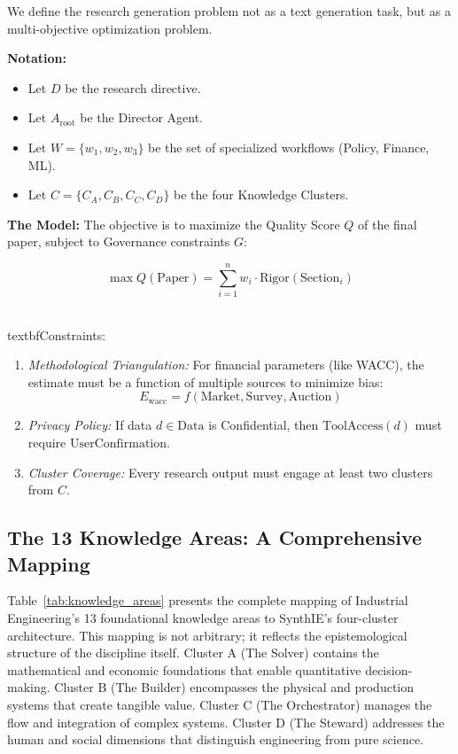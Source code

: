 \documentclass[12pt,a4paper]{article}
\begin{document}
We define the research generation problem not as a text generation task, but as a multi-objective optimization problem.

\textbf{Notation:}
\begin{itemize}[leftmargin=*]
    \item Let $D$ be the research directive.
    \item Let $A_{\text{root}}$ be the Director Agent.
    \item Let $W = \{w_1, w_2, w_3\}$ be the set of specialized workflows (Policy, Finance, ML).
    \item Let $C = \{C_A, C_B, C_C, C_D\}$ be the four Knowledge Clusters.
\end{itemize}

\textbf{The Model:} The objective is to maximize the Quality Score $Q$ of the final paper, subject to Governance constraints $G$:

\begin{equation}
\max Q(\text{Paper}) = \sum_{i=1}^{n} w_i \cdot \text{Rigor}(\text{Section}_i)
\end{equation}

\\textbf{Constraints:}
\begin{enumerate}[leftmargin=*]
    \item \textit{Methodological Triangulation:} For financial parameters (like WACC), the estimate must be a function of multiple sources to minimize bias:
    \begin{equation}
    E_{\text{wacc}} = f(\text{Market}, \text{Survey}, \text{Auction})
    \end{equation}
    
    \item \textit{Privacy Policy:} If data $d \in \text{Data}$ is Confidential, then $\text{ToolAccess}(d)$ must require $\text{UserConfirmation}$.
    
    \item \textit{Cluster Coverage:} Every research output must engage at least two clusters from $C$.
\end{enumerate}

\subsection{The 13 Knowledge Areas: A Comprehensive Mapping}

Table~\ref{tab:knowledge_areas} presents the complete mapping of Industrial Engineering's 13 foundational knowledge areas to SynthIE's four-cluster architecture. This mapping is not arbitrary; it reflects the epistemological structure of the discipline itself. Cluster A (The Solver) contains the mathematical and economic foundations that enable quantitative decision-making. Cluster B (The Builder) encompasses the physical and production systems that create tangible value. Cluster C (The Orchestrator) manages the flow and integration of complex systems. Cluster D (The Steward) addresses the human and social dimensions that distinguish engineering from pure science.
\end{document}
